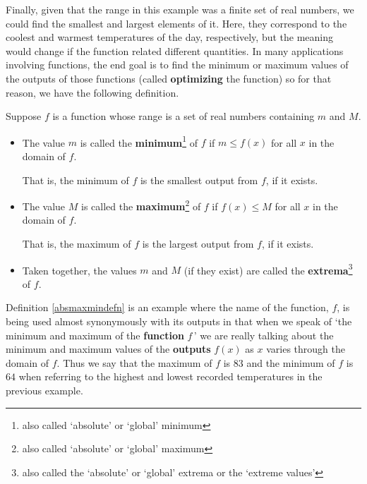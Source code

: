 \documentclass{ximera}
\begin{document}
Finally, given that the range in this example was a finite set of real numbers, we could find the smallest and largest elements of it.  Here, they correspond to the coolest and warmest temperatures of the day, respectively, but the meaning would change if the function related different quantities.  In many applications involving functions, the end goal is to find the minimum or maximum values of the outputs of those functions (called \textbf{optimizing} the function) so for that reason, we have the following definition.  


\begin{definition}\label{absmaxmindefn}

Suppose $f$ is a function whose range is a set of real numbers containing $m$ and $M$.

\begin{itemize}

\item  The value $m$ is called the \textbf{minimum}\footnote{also called `absolute' or `global' minimum} of $f$ if $m \leq f(x)$ for all $x$ in the domain of $f$. 

That is, the minimum of $f$ is the smallest output from $f$, if it exists.

\item  The value $M$ is called the \textbf{maximum}\footnote{also called `absolute' or `global' maximum}  of $f$ if $f(x) \leq M$ for all $x$ in the domain of $f$. 

That is, the maximum of $f$ is the largest output from $f$, if it exists.

\item  Taken together, the values $m$ and $M$ (if they exist) are called the \textbf{extrema}\footnote{also called the `absolute' or `global' extrema or the `extreme values'} of $f$.

\end{itemize}

\end{definition}


Definition \ref{absmaxmindefn} is an example where the name of the function, $f$, is being used almost synonymously with its outputs in that when we speak of `the minimum and maximum of the \textbf{function} $f\,$' we are really talking about the minimum and maximum values of the \textbf{outputs} $f(x)$ as $x$ varies through the domain of $f$.  Thus we say that the  maximum of $f$ is $83$ and the  minimum of $f$ is $64$ when referring to the highest and lowest recorded temperatures in the previous example.  
\end{document}
